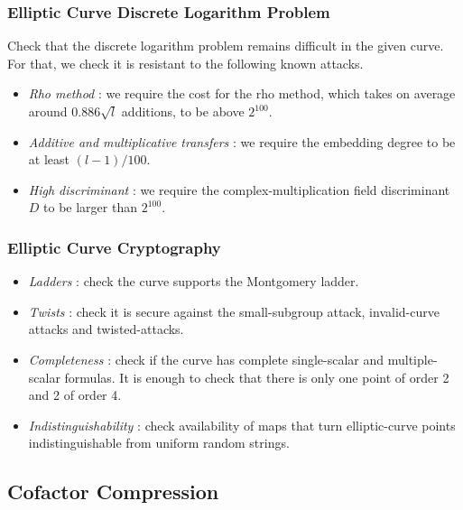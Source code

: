 \documentclass{article}
\theoremstyle{definition}
\theoremstyle{remark}
\begin{document}
	\subsubsection{Elliptic Curve Discrete Logarithm Problem}
	
	Check that the discrete logarithm problem remains difficult in the given curve. For that, we check it is resistant to the following known attacks. %
	
	\begin{itemize}
		\item {\it Rho method} \cite[Sec. V.1]{seroussi}: we require the cost for the rho method, which takes on average around $0.886 \sqrt{l}$ additions, to be above $2^{100}$.	
		\item {\it Additive and multiplicative %
			transfers} \cite[Sec. V.2]{seroussi}: we require the embedding degree to be at least $(l-1)/100$.
		\item {\it High discriminant} \cite[Sec. IX.3]{seroussi}: we require the complex-multiplication field discriminant $D$ to be larger than $2^{100}$. 
	\end{itemize}
	
	\subsubsection{Elliptic Curve Cryptography}
	
	\begin{itemize}
		\item {\it Ladders} \cite{montgomery}:   check the curve supports the Montgomery ladder. 
		\item {\it Twists} \cite[twist]{safe-curves}: check it is secure against the small-subgroup attack, invalid-curve attacks and twisted-attacks.
		\item {\it Completeness} \cite[complete]{safe-curves}: check if the curve has complete single-scalar and multiple-scalar formulas. It is enough to check that there is only one point of order 2 and 2 of order 4. 
		\item {\it Indistinguishability} \cite{indist}: check availability of maps that turn elliptic-curve points indistinguishable from uniform random strings.
	\end{itemize}
	
	\subsection{Cofactor Compression}
	
\end{document}
